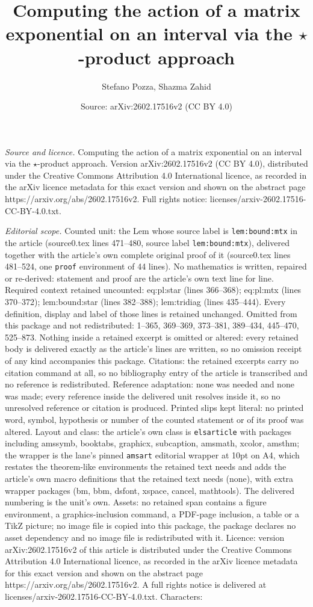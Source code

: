 \documentclass[10pt,a4paper]{amsart}
\title[Computing the action of a matrix exponential on an interval ]{Computing the action of a matrix exponential on an interval via the $\star$-product approach}
\author{Stefano Pozza, Shazma Zahid}
\date{Source: arXiv:2602.17516v2 (CC BY 4.0)}
\begin{document}
\maketitle

\noindent\emph{Source and licence.} Computing the action of a matrix exponential on an interval via the $\star$-product approach. Version arXiv:2602.17516v2 (CC BY 4.0), distributed under the Creative Commons Attribution 4.0 International licence, as recorded in the arXiv licence metadata for this exact version and shown on the abstract page https://arxiv.org/abs/2602.17516v2. Full rights notice: licenses/arxiv-2602.17516-CC-BY-4.0.txt.\par\smallskip

\noindent\textit{Editorial scope.} Counted unit: the Lem whose source label is \texttt{lem:bound:mtx} in the article (source0.tex lines 471--480, source label \texttt{lem:bound:mtx}), delivered together with the article's own complete original proof of it (source0.tex lines 481--524, one \texttt{proof} environment of 44 lines). No mathematics is written, repaired or re-derived: statement and proof are the article's own text line for line. Required context retained uncounted: eq:pl:star (lines 366--368); eq:pl:mtx (lines 370--372); lem:bound:star (lines 382--388); lem:tridiag (lines 435--444). Every definition, display and label of those lines is retained unchanged. Omitted from this package and not redistributed: 1--365, 369--369, 373--381, 389--434, 445--470, 525--873. Nothing inside a retained excerpt is omitted or altered: every retained body is delivered exactly as the article's lines are written, so no omission receipt of any kind accompanies this package. Citations: the retained excerpts carry no citation command at all, so no bibliography entry of the article is transcribed and no reference is redistributed. Reference adaptation: none was needed and none was made; every reference inside the delivered unit resolves inside it, so no unresolved reference or citation is produced. Printed slips kept literal: no printed word, symbol, hypothesis or number of the counted statement or of its proof was altered. Layout and class: the article's own class is \texttt{elsarticle} with packages including amssymb, booktabs, graphicx, subcaption, amsmath, xcolor, amsthm; the wrapper is the lane's pinned \texttt{amsart} editorial wrapper at 10pt on A4, which restates the theorem-like environments the retained text needs and adds the article's own macro definitions that the retained text needs (none), with extra wrapper packages (bm, bbm, dsfont, xspace, cancel, mathtools). The delivered numbering is the unit's own. Assets: no retained span contains a figure environment, a graphics-inclusion command, a PDF-page inclusion, a table or a TikZ picture; no image file is copied into this package, the package declares no asset dependency and no image file is redistributed with it. Licence: version arXiv:2602.17516v2 of this article is distributed under the Creative Commons Attribution 4.0 International licence, as recorded in the arXiv licence metadata for this exact version and shown on the abstract page https://arxiv.org/abs/2602.17516v2. A full rights notice is delivered at licenses/arxiv-2602.17516-CC-BY-4.0.txt. Characters: 
\end{document}
